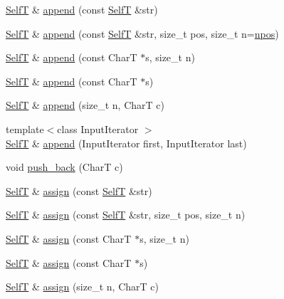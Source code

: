 \begin{CompactItemize}
\item 
\hyperlink{classvector__string}{SelfT} \& \hyperlink{classvector__string_8117d617b230c2dc55045b58a026a70c}{append} (const \hyperlink{classvector__string}{SelfT} \&str)
\item 
\hyperlink{classvector__string}{SelfT} \& \hyperlink{classvector__string_e6255b18101142fcc319bff78d143e55}{append} (const \hyperlink{classvector__string}{SelfT} \&str, size\_\-t pos, size\_\-t n=\hyperlink{classvector__string_073b48043937e79ead0703a49426be1a}{npos})
\item 
\hyperlink{classvector__string}{SelfT} \& \hyperlink{classvector__string_680eb4134425df7845f49bcdc852bee7}{append} (const CharT $\ast$s, size\_\-t n)
\item 
\hyperlink{classvector__string}{SelfT} \& \hyperlink{classvector__string_151eff60f6b36bfe2d0c964017ef64b9}{append} (const CharT $\ast$s)
\item 
\hyperlink{classvector__string}{SelfT} \& \hyperlink{classvector__string_5ba69172d97507ef4ad47a175cfe2d57}{append} (size\_\-t n, CharT c)
\item 
{\footnotesize template$<$class InputIterator $>$ }\\\hyperlink{classvector__string}{SelfT} \& \hyperlink{classvector__string_cd86d82c4f9a8f2260d09e0fc22ad073}{append} (InputIterator first, InputIterator last)
\item 
void \hyperlink{classvector__string_91e53ed1638e78aecd9ec100949a46ef}{push\_\-back} (CharT c)
\item 
\hyperlink{classvector__string}{SelfT} \& \hyperlink{classvector__string_58a2e4110d4653022e5da2a46e5d56e5}{assign} (const \hyperlink{classvector__string}{SelfT} \&str)
\item 
\hyperlink{classvector__string}{SelfT} \& \hyperlink{classvector__string_370b202bdf3c095e5d91e2d1695bed8b}{assign} (const \hyperlink{classvector__string}{SelfT} \&str, size\_\-t pos, size\_\-t n)
\item 
\hyperlink{classvector__string}{SelfT} \& \hyperlink{classvector__string_6122c21fde4b8731e4eba761b1803900}{assign} (const CharT $\ast$s, size\_\-t n)
\item 
\hyperlink{classvector__string}{SelfT} \& \hyperlink{classvector__string_34c0ca4e69795856ed1b31c67c72ffff}{assign} (const CharT $\ast$s)
\item 
\hyperlink{classvector__string}{SelfT} \& \hyperlink{classvector__string_ea3113685a1ba396a16bd076ea95a97a}{assign} (size\_\-t n, CharT c)
\item 

\end{CompactItemize}
